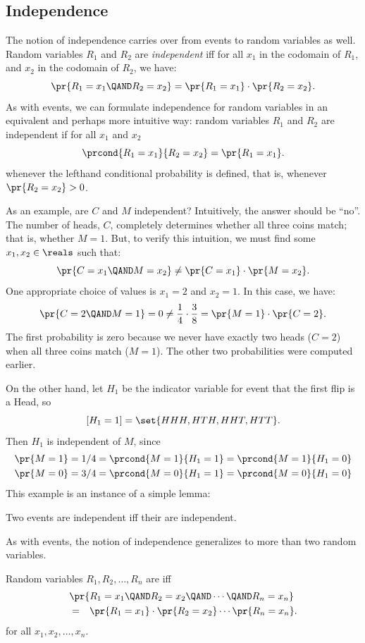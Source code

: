 \subsection{Independence}

The notion of independence carries over from events to random variables as
well.  Random variables $R_1$ and $R_2$ are  \emph{independent} iff for all $x_1$ in the codomain of
$R_1$, and $x_2$ in the codomain of $R_2$, we have:
\[
\pr{R_1 = x_1 \QAND R_2 = x_2}  =  \pr{R_1 = x_1} \cdot \pr{R_2 = x_2}.
\]
As with events, we can formulate independence for random
variables in an equivalent and perhaps more intuitive way: random
variables $R_1$ and $R_2$ are independent if for all $x_1$ and $x_2$
\[
\prcond{R_1 = x_1}{R_2 = x_2}  =  \pr{R_1 = x_1}.
\]
whenever the lefthand conditional probability is defined, that is,
whenever $\pr{R_2 = x_2} > 0$.

As an example, are $C$ and $M$ independent?  Intuitively, the answer
should be ``no''.  The number of heads, $C$, completely determines
whether all three coins match; that is, whether $M = 1$.  But, to
verify this intuition, we must find some $x_1, x_2 \in \reals$
such that:
\[
\pr{C = x_1 \QAND M = x_2} \neq \pr{C = x_1} \cdot \pr{M = x_2}.
\]
One appropriate choice of values is $x_1 = 2$ and $x_2 = 1$.
In this case, we have:
\[
\pr{C = 2 \QAND M = 1} = 0 \neq \dfrac{1}{4} \cdot \dfrac{3}{8} = \pr{M
= 1} \cdot \pr{C = 2}.
\]
The first probability is zero because we never have exactly two heads ($C
= 2$) when all three coins match ($M = 1$).  The other two probabilities
were computed earlier.

On the other hand, let $H_1$ be the indicator variable for event that the
first flip is a Head, so
\[
[H_1 = 1] = \set{HHH, HTH, HHT, HTT}.
\]
Then $H_1$ is independent of $M$, since
\begin{align*}
\pr{M=1} & = 1/4 = \prcond{M=1}{H_1=1} = \prcond{M=1}{H_1=0}\\
\pr{M=0} & = 3/4 = \prcond{M=0}{H_1=1} = \prcond{M=0}{H_1=0}
\end{align*}
This example is an instance of a simple lemma:
\begin{lemma}
  Two events are independent iff their  are
  independent.
\end{lemma}
As with events, the notion of independence generalizes to more than two
random variables.
\begin{definition}
Random variables $R_1, R_2, \dots, R_n$ are  iff
\begin{eqnarray*}
\lefteqn{\pr{R_1 = x_1 \QAND R_2 = x_2 \QAND \cdots \QAND R_n = x_n}}\\
        & = & \pr{R_1 = x_1} \cdot \pr{R_2 = x_2} \cdots \pr{R_n = x_n}.
\end{eqnarray*}
for all $x_1, x_2, \dots, x_n$.
\end{definition}

